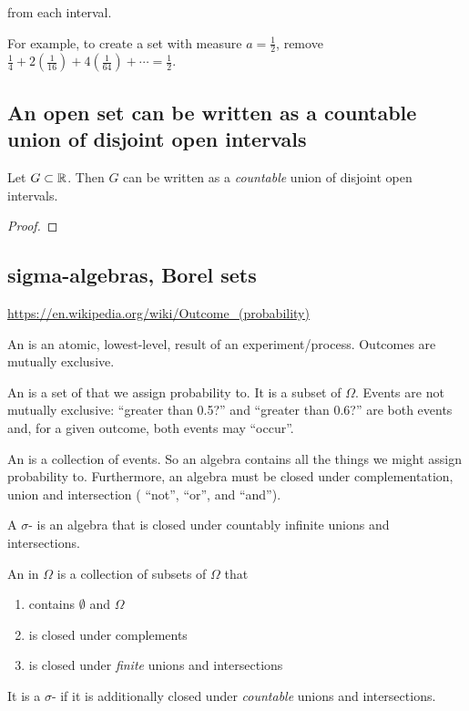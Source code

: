     from each interval.

    For example, to create a set with measure $a = \frac{1}{2}$,
    remove $\frac{1}{4} + 2(\frac{1}{16}) + 4(\frac{1}{64}) + \cdots = \frac{1}{2}$.


\subsection{An open set can be written as a countable union of disjoint open intervals}

\begin{theorem}
  Let $G \subset \mathbb{R}$. Then $G$ can be written as a {\it countable} union of disjoint open intervals.
\end{theorem}

\begin{proof}

\end{proof}

\subsection{sigma-algebras, Borel sets}

\url{https://en.wikipedia.org/wiki/Outcome_(probability)}


An  is an atomic, lowest-level, result of an experiment/process. Outcomes are mutually exclusive.

An  is a set of  that we assign probability to. It is a subset of $\Omega$. Events are not mutually
exclusive: ``greater than 0.5?​'' and ``greater than 0.6?​'' are both events and, for a given outcome, both events
may ``occur​''.

An  is a collection of events. So an algebra contains all the things we might assign probability to.
Furthermore, an algebra must be closed under complementation, union and intersection ( ``not​'', ``or​'', and ``and​'').

A $\sigma$- is an algebra that is closed under countably infinite unions and intersections.




\begin{definition*}
  An  in $\Omega$ is a collection of subsets of $\Omega$ that
  \begin{enumerate}
  \item contains $\emptyset$ and $\Omega$
  \item is closed under complements
  \item is closed under {\it finite} unions and intersections
  \end{enumerate}

  It is a $\sigma$- if it is additionally closed under {\it countable} unions and intersections.
\end{definition*}

